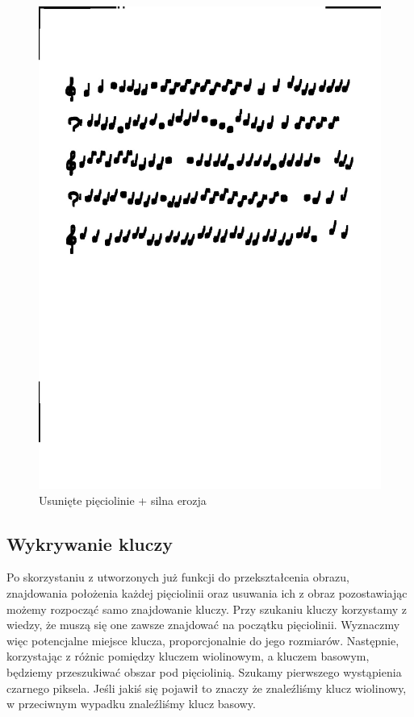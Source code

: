 \documentclass[11pt]{article}
\begin{document}
\begin{figure}[H]
    \centering
    \graphicspath{ {blobs/} }
    \includegraphics[scale=0.15]{4.jpg}
    \caption{Usunięte pięciolinie + silna erozja}
    \label{fig:universe}
    \end{figure}

    \subsection{Wykrywanie kluczy}
    Po skorzystaniu z utworzonych już funkcji do przekształcenia obrazu, znajdowania położenia każdej pięciolinii oraz usuwania ich z obraz pozostawiając możemy rozpocząć samo znajdowanie kluczy.
    Przy szukaniu kluczy korzystamy z wiedzy, że muszą się one zawsze znajdować na początku pięciolinii. Wyznaczmy więc potencjalne miejsce klucza, proporcjonalnie do jego rozmiarów.
    Następnie, korzystając z różnic pomiędzy kluczem wiolinowym, a kluczem basowym, będziemy przeszukiwać obszar pod pięciolinią. Szukamy pierwszego wystąpienia czarnego piksela. Jeśli jakiś się pojawił to znaczy że znaleźliśmy klucz wiolinowy, w przeciwnym wypadku znaleźliśmy klucz basowy.
    
\end{document}
